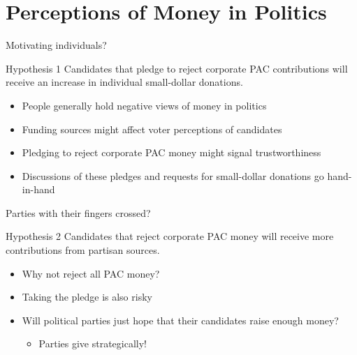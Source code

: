 \documentclass[12pt, aspectratio=169]{beamer}
\begin{document}


\section{Perceptions of Money in Politics} \label{sec: framework}


\begin{frame}{Motivating individuals?}

	\begin{alertblock}{Hypothesis 1}
Candidates that pledge to reject corporate PAC contributions will receive an increase in individual small-dollar donations.
\end{alertblock} \pause

	\begin{itemize}
		\item People generally hold negative views of money in politics {\tiny \citep{lubenow2001}} \pause
		\item Funding sources might affect voter perceptions of candidates {\tiny \citep{bowler2016}} \pause
		\item Pledging to reject corporate PAC money might signal trustworthiness \pause
		\item Discussions of these pledges and requests for small-dollar donations go hand-in-hand
	\end{itemize}
	
\end{frame}


\begin{frame}{Parties with their fingers crossed?}

\begin{alertblock}{Hypothesis 2}
Candidates that reject corporate PAC money will receive more contributions from partisan sources.
\end{alertblock} \pause

\begin{itemize}
	\item Why not reject all PAC money? \pause
	\item Taking the pledge is also risky \pause
	\item Will political parties just hope that their candidates raise enough money? \pause
	\begin{itemize}
		\item Parties give strategically! {\tiny \citep{wilcox1989, currinder2003, herrnson2009}}
	\end{itemize}
\end{itemize}

\end{frame}
\end{document}
